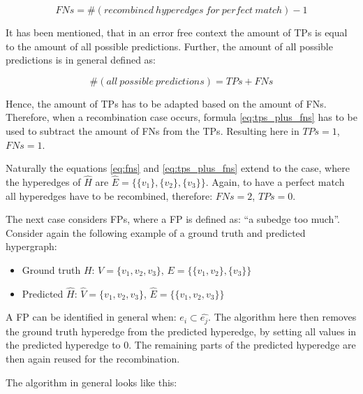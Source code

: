 \begin{equation}
    FNs = \#(recombined\ hyperedges\ for\ perfect\ match) - 1
    \label{eq:fns}
\end{equation}

It has been mentioned, that in an error free context the amount of \acp{TP} is equal to the amount of all possible predictions.
Further, the amount of all possible predictions is in general defined as:

\begin{equation}
    \#(all\ possible\ predictions) = TPs + FNs
    \label{eq:tps_plus_fns}
\end{equation}

Hence, the amount of \acp{TP} has to be adapted based on the amount of \acp{FN}.
Therefore, when a recombination case occurs, formula \ref{eq:tps_plus_fns} has to be used to subtract the amount of \acp{FN} from the \acp{TP}.
Resulting here in $TPs = 1$, $FNs = 1$.

Naturally the equations \ref{eq:fns} and \ref{eq:tps_plus_fns} extend to the case, where the hyperedges of $\hat{H}$ are $\hat{E} = \{\{v_1\}, \{v_2\}, \{v_3\}\}$.
Again, to have a perfect match all hyperedges have to be recombined, therefore: $FNs = 2$, $TPs = 0$.

The next case considers \acp{FP}, where a \ac{FP} is defined as: ``a subedge too much''.
Consider again the following example of a ground truth and predicted hypergraph:

\begin{itemize}
    \item Ground truth $H$: $V = \{v_1, v_2, v_3\}$, $E = \{\{v_1, v_2\}, \{v_3\}\}$
    \item Predicted $\hat{H}$: $\hat{V} = \{v_1, v_2, v_3\}$, $\hat{E} = \{\{v_1, v_2, v_3\}\}$
\end{itemize}

A \ac{FP} can be identified in general when: $e_i \subset \hat{e_j}$.
The algorithm here then removes the ground truth hyperedge from the predicted hyperedge, by setting all values in the predicted hyperedge to 0.
The remaining parts of the predicted hyperedge are then again reused for the recombination.

The algorithm in general looks like this:

